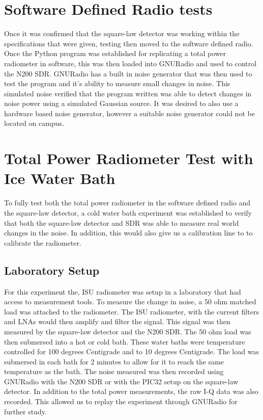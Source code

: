 \section{Software Defined Radio tests}
Once it was confirmed that the square-law detector was working within the specifications that were given, testing then moved to the software defined radio.  Once the Python program was established for replicating a total power radiometer in software, this was then loaded into GNURadio and used to control the N200 SDR.  GNURadio has a built in noise generator that was then used to test the program and it's ability to measure small changes in noise.  This simulated noise verified that the program written was able to detect changes in noise power using a simulated Gaussian source.  It was desired to also use a hardware based noise generator, however a suitable noise generator could not be located on campus.

\section{Total Power Radiometer Test with Ice Water Bath}
To fully test both the total power radiometer in the software defined radio and the square-law detector, a cold water bath experiment was established to verify that both the square-law detector and SDR was able to measure real world changes in the noise.  In addition, this would also give us a calibration line to to calibrate the radiometer.

\subsection{Laboratory Setup}
For this experiment the, ISU radiometer was setup in a laboratory that had access to measurement tools.  To measure the change in noise, a 50 ohm matched load was attached to the radiometer.  The ISU radiometer, with the current filters and LNAs would then amplify and filter the signal.  This signal was then measured by the square-law detector and the N200 SDR.  The 50 ohm load was then submersed into a hot or cold bath.  These water baths were temperature controlled for 100 degrees Centigrade and to 10 degrees Centigrade.  The load was submersed in each bath for 2 minutes to allow for it to reach the same temperature as the bath.  The noise measured was then recorded using GNURadio with the N200 SDR or with the PIC32 setup on the square-law detector.  In addition to the total power measurements, the raw I-Q data was also recorded.  This allowed us to replay the experiment through GNURadio for further study.
